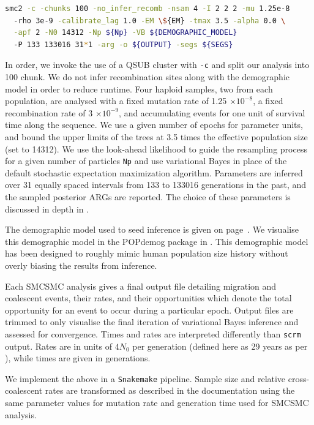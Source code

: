 \begin{lstlisting}[language=Bash]
smc2 -c -chunks 100 -no_infer_recomb -nsam 4 -I 2 2 2 -mu 1.25e-8 
  -rho 3e-9 -calibrate_lag 1.0 -EM \${EM} -tmax 3.5 -alpha 0.0 \
  -apf 2 -N0 14312 -Np ${Np} -VB ${DEMOGRAPHIC_MODEL} 
  -P 133 133016 31*1 -arg -o ${OUTPUT} -segs ${SEGS}
\end{lstlisting}

In order, we invoke the use of a QSUB cluster with {\tt -c} and split our analysis into 100 chunk. We do not infer recombination sites along with the demographic model in order to reduce runtime. Four haploid samples, two from each population, are analysed with a fixed mutation rate of 1.25 $\times 10^{-8}$, a fixed recombination rate of 3 $\times 10^{-9}$, and accumulating events for one unit of survival time along the sequence. We use a given number of epochs for parameter units, and bound the upper limits of the trees at 3.5 times the effective population size (set to 14312). We use the look-ahead likelihood to guide the resampling process for a given number of particles {\tt Np} and use variational Bayes in place of the default stochastic expectation maximization algorithm. Parameters are inferred over 31 equally spaced intervals from 133 to 133016 generations in the past, and the sampled posterior ARGs are reported. The choice of these parameters is discussed in depth in \cite{10.1371/journal.pone.0247647}. 

The demographic model used to seed inference is given on page~\pageref{app:dem_model:seed}. We visualise this demographic model in the POPdemog package in  \cite{Zhou2018}. This demographic model has been designed to roughly mimic human population size history without overly biasing the results from inference. 

Each SMCSMC analysis gives a final output file detailing migration and coalescent events, their rates, and their opportunities which denote the total opportunity for an event to occur during a particular epoch. Output files are trimmed to only visualise the final iteration of variational Bayes inference and assessed for convergence. Times and rates are interpreted differently than {\tt scrm} output. Rates are in units of $4N_0$ per generation (defined here as 29 years as per \cite{Fenner2005}), while times are given in generations. 

We implement the above in a {\tt Snakemake} pipeline. Sample size and relative cross-coalescent rates are transformed as described in the documentation using the same parameter values for mutation rate and generation time used for SMCSMC analysis.


